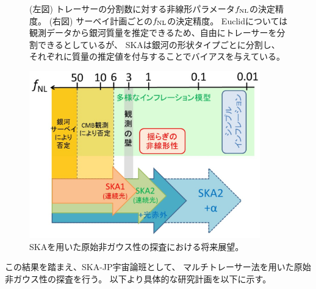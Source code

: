 \begin{enumerate}
\begin{description}
\begin{figure}[t]
\begin{minipage}{0.52\hsize}
 \end{minipage}
\caption{(左図) トレーサーの分割数に対する非線形パラメータ$f_{\rm NL}$の決定精度。
(右図) サーベイ計画ごとの$f_{\rm NL}$の決定精度。
Euclidについては観測データから銀河質量を推定できるため、自由にトレーサーを分割できるとしているが、
SKAは銀河の形状タイプごとに分割し、それぞれに質量の推定値を付与することでバイアスを与えている。
\label{fig:sigma_fNL_multitracer}}
\end{figure}
\begin{figure}
\begin{center}
\includegraphics[width=100mm,clip]{cosmology/sigma_fNL_future.eps}
\caption{
SKAを用いた原始非ガウス性の探査における将来展望。
}
\label{fig:sigma_fNL_future}
\end{center}
\end{figure}

この結果を踏まえ、SKA-JP宇宙論班として、
マルチトレーサー法を用いた原始非ガウス性の探査を行う。
以下より具体的な研究計画を以下に示す。


\end{description}
\end{enumerate}
